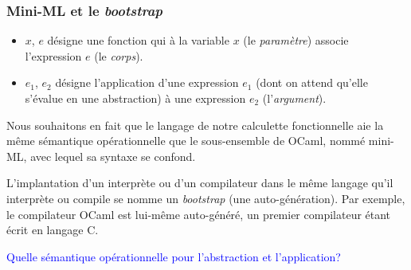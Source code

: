 %
\begin{frame}
\frametitle{Mini-ML et le \emph{bootstrap}}

\begin{itemize}

  \item {} \lpar$x$, $e$\rpar{} désigne une fonction qui à
  la variable $x$ (le \emph{paramètre}) associe l'expression $e$ (le
  \emph{corps}).

  \item {} \lpar$e_1$, $e_2$\rpar{} désigne l'application
  d'une expression $e_1$ (dont on attend qu'elle s'évalue en une
  abstraction) à une expression $e_2$ (l'\emph{argument}).

\end{itemize}
Nous souhaitons en fait que le langage de notre calculette
fonctionnelle aie la même sémantique opérationnelle que le
sous-ensemble de OCaml, nommé mini-ML, avec lequel sa syntaxe se
confond.

\bigskip

L'implantation d'un interprète ou d'un compilateur dans le même
langage qu'il interprète ou compile se nomme un \emph{bootstrap} (une
auto-génération). Par exemple, le compilateur OCaml est lui-même
auto-généré, un premier compilateur étant écrit en langage C.

\textcolor{blue}{Quelle sémantique opérationnelle pour l'abstraction et
l'application?}

\end{frame}

